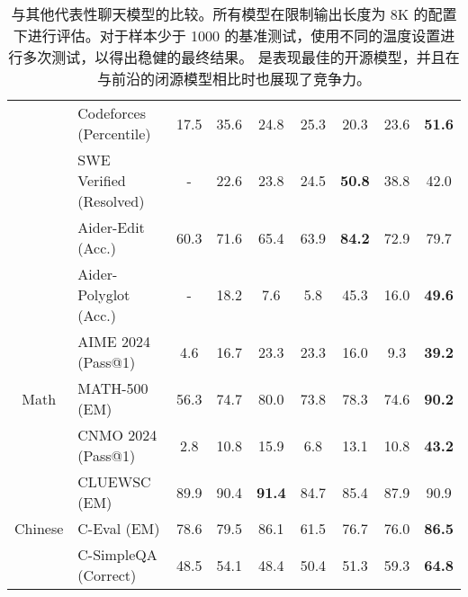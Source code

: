 \begin{table}[h]
\begin{tabular}{@{}c l | c  c | c c c c| c@{}}
    & Codeforces {\tiny (Percentile)} & 17.5 & 35.6 & 24.8 & 25.3 & 20.3 & 23.6 & \textbf{51.6} \\
    & SWE Verified {\tiny (Resolved)} &-&22.6& 23.8 & 24.5 & \textbf{50.8}&38.8&42.0\\
    & Aider-Edit {\tiny (Acc.)} & 60.3& 71.6 & 65.4 & 63.9 & \textbf{84.2} &72.9&79.7 \\
    & Aider-Polyglot {\tiny (Acc.)}  & -& 18.2 & 7.6 & 5.8 & 45.3&16.0&\textbf{49.6} \\
    \midrule
    \multirow{3}{*}{Math} & AIME 2024 {\tiny (Pass@1)} & 4.6 & 16.7 & 23.3 & 23.3 & 16.0 & 9.3 & \textbf{39.2} \\
    & MATH-500 {\tiny (EM)} &  56.3 & 74.7 & 80.0 & 73.8 & 78.3 & 74.6&\textbf{90.2} \\
    & CNMO 2024 {\tiny (Pass@1)} & 2.8 & 10.8 & 15.9& 6.8& 13.1 & 10.8 &\textbf{43.2} \\
    \midrule
    \multirow{3}{*}{Chinese} & CLUEWSC {\tiny (EM)} & 89.9& 90.4 & \textbf{91.4} & 84.7 & 85.4 & 87.9 & 90.9\\
    & C-Eval {\tiny (EM)} & 78.6& 79.5 & 86.1 & 61.5 & 76.7 & 76.0 & \textbf{86.5}\\
     & C-SimpleQA {\tiny (Correct)}  & 48.5& 54.1 & 48.4 & 50.4 & 51.3 & 59.3 & \textbf{64.8}\\
    \bottomrule
    \end{tabular}
    \caption{\dsviii{} 与其他代表性聊天模型的比较。所有模型在限制输出长度为 8K 的配置下进行评估。对于样本少于 1000 的基准测试，使用不同的温度设置进行多次测试，以得出稳健的最终结果。\dsviii{} 是表现最佳的开源模型，并且在与前沿的闭源模型相比时也展现了竞争力。}
    \label{tab:chat}
\end{table}
